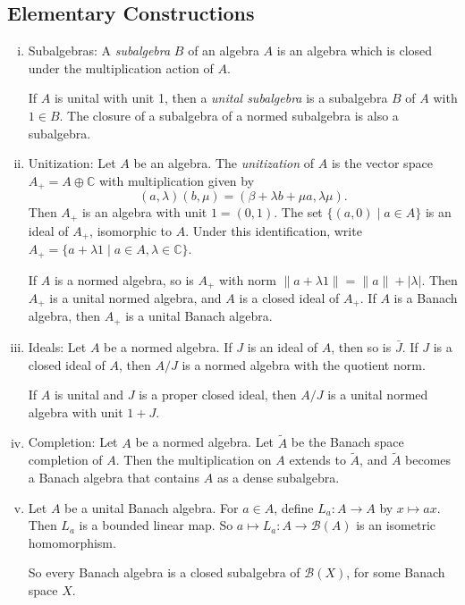 \documentclass[12pt]{article}
\begin{document}
\subsection{Elementary Constructions}%
\label{sub:ecs}

\begin{enumerate}[(i)]
	\item Subalgebras: A \emph{subalgebra} $B$ of an algebra $A$ is an algebra which is closed under the multiplication action of $A$.

		If $A$ is unital with unit 1, then a \emph{unital subalgebra} is a subalgebra $B$ of $A$ with $1 \in B$. The closure of a subalgebra of a normed subalgebra is also a subalgebra.
	\item Unitization: Let $A$ be an algebra. The \emph{unitization} of $A$ is the vector space $A_+ = A \oplus \mathbb{C}$ with multiplication given by
		\[
			(a , \lambda)(b, \mu) = (\beta + \lambda b + \mu a, \lambda \mu).
		\]
		Then $A_+$ is an algebra with unit $1 = (0, 1)$. The set $\{(a, 0) \mid a \in A\}$ is an ideal of $A_+$, isomorphic to $A$. Under this identification, write $A_+ = \{a + \lambda 1 \mid a \in A, \lambda \in \mathbb{C}\}$.

		If $A$ is a normed algebra, so is $A_+$ with norm $\|a + \lambda 1\| = \|a\| + |\lambda|$. Then $A_+$ is a unital normed algebra, and $A$ is a closed ideal of $A_+$. If $A$ is a Banach algebra, then $A_+$ is a unital Banach algebra.
	\item Ideals: Let $A$ be a normed algebra. If $J$ is an ideal of $A$, then so is $\bar J$. If $J$ is a closed ideal of $A$, then $A / J$ is a normed algebra with the quotient norm.

		If $A$ is unital and $J$ is a proper closed ideal, then $A / J$ is a unital normed algebra with unit $1 + J$.
	\item Completion: Let $A$ be a normed algebra. Let $\tilde A$ be the Banach space completion of $A$. Then the multiplication on $A$ extends to $\tilde A$, and $\tilde A$ becomes a Banach algebra that contains $A$ as a dense subalgebra.
	\item Let $A$ be a unital Banach algebra. For $a \in A$, define $L_a : A \to A$ by $x \mapsto ax$. Then $L_a$ is a bounded linear map. So $a \mapsto L_a : A \to \mathcal{B}(A)$ is an isometric homomorphism.

		So every Banach algebra is a closed subalgebra of $\mathcal{B}(X)$, for some Banach space $X$.
\end{enumerate}
\end{document}
